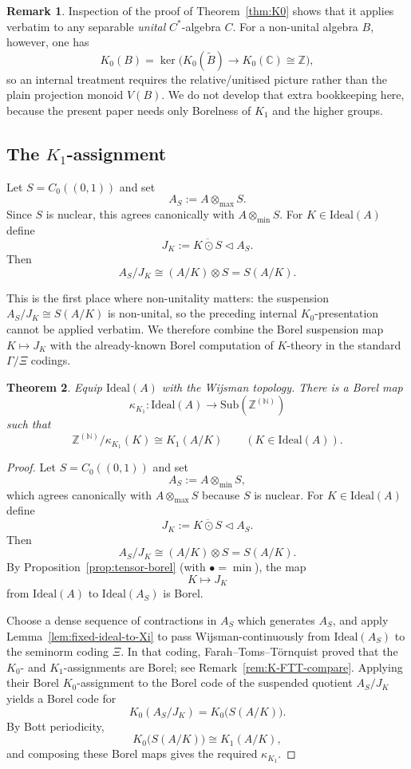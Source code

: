 \documentclass[12pt,fleqn,a4paper]{amsart}
\numberwithin{equation}{section}
\newtheorem{theorem}{Theorem}[section]
\theoremstyle{definition}
\newtheorem{remark}[theorem]{Remark}
\newcommand{\N}{\mathbb{N}}
\newcommand{\C}{\mathbb{C}}
\newcommand{\Z}{\mathbb{Z}}
\newcommand{\Ideal}{\mathrm{Ideal}}
\newcommand{\Sub}{\mathrm{Sub}}
\begin{document}
\begin{remark}
\label{rem:K0-general}
Inspection of the proof of Theorem~\ref{thm:K0} shows that it applies verbatim to
any separable \emph{unital} $C^*$-algebra $C$.
For a non-unital algebra $B$, however, one has
\[
K_0(B)=\ker\bigl(K_0(\widetilde B)\to K_0(\C)\cong \Z\bigr),
\]
so an internal treatment requires the relative/unitised picture rather than the
plain projection monoid $V(B)$.
We do not develop that extra bookkeeping here, because the present paper needs
only Borelness of $K_1$ and the higher groups.
\end{remark}

\subsection{The \texorpdfstring{$K_1$}{K1}-assignment}\label{subsec:K1}

Let $S=C_0((0,1))$ and set
\[
A_S:=A\otimes_{\max} S.
\]
Since $S$ is nuclear, this agrees canonically with $A\otimes_{\min}S$.
For $K\in\Ideal(A)$ define
\[
J_K:=\overline{K\odot S}\triangleleft A_S.
\]
Then
\[
A_S/J_K\cong (A/K)\otimes S = S(A/K).
\]

This is the first place where non-unitality matters: the suspension
$A_S/J_K\cong S(A/K)$ is non-unital, so the preceding internal $K_0$-presentation
cannot be applied verbatim.
We therefore combine the Borel suspension map $K\mapsto J_K$ with the already-known
Borel computation of $K$-theory in the standard $\Gamma/\Xi$ codings.

\begin{theorem}\label{thm:K1}
Equip $\Ideal(A)$ with the Wijsman topology.  There is a Borel map
\[
\kappa_{K_1}:\Ideal(A)\to\Sub(\Z^{(\N)})
\]
such that
\[
\Z^{(\N)}/\kappa_{K_1}(K)\cong K_1(A/K)
\qquad (K\in\Ideal(A)).
\]
\end{theorem}

\begin{proof}
Let $S=C_0((0,1))$ and set
\[
A_S:=A\otimes_{\min} S,
\]
which agrees canonically with $A\otimes_{\max} S$ because $S$ is nuclear.
For $K\in\Ideal(A)$ define
\[
J_K:=\overline{K\odot S}\triangleleft A_S.
\]
Then
\[
A_S/J_K\cong (A/K)\otimes S = S(A/K).
\]
By Proposition~\ref{prop:tensor-borel} (with $\bullet=\min$), the map
\[
K\longmapsto J_K
\]
from $\Ideal(A)$ to $\Ideal(A_S)$ is Borel.

Choose a dense sequence of contractions in $A_S$ which generates $A_S$, and apply
Lemma~\ref{lem:fixed-ideal-to-Xi} to pass Wijsman-continuously from
$\Ideal(A_S)$ to the seminorm coding $\Xi$.
In that coding, Farah--Toms--T\"ornquist proved that the $K_0$- and $K_1$-assignments
are Borel; see Remark~\ref{rem:K-FTT-compare}.
Applying their Borel $K_0$-assignment to the Borel code of the suspended quotient
$A_S/J_K$ yields a Borel code for
\[
K_0(A_S/J_K)=K_0\bigl(S(A/K)\bigr).
\]
By Bott periodicity,
\[
K_0\bigl(S(A/K)\bigr)\cong K_1(A/K),
\]
and composing these Borel maps gives the required $\kappa_{K_1}$.
\end{proof}
\end{document}
